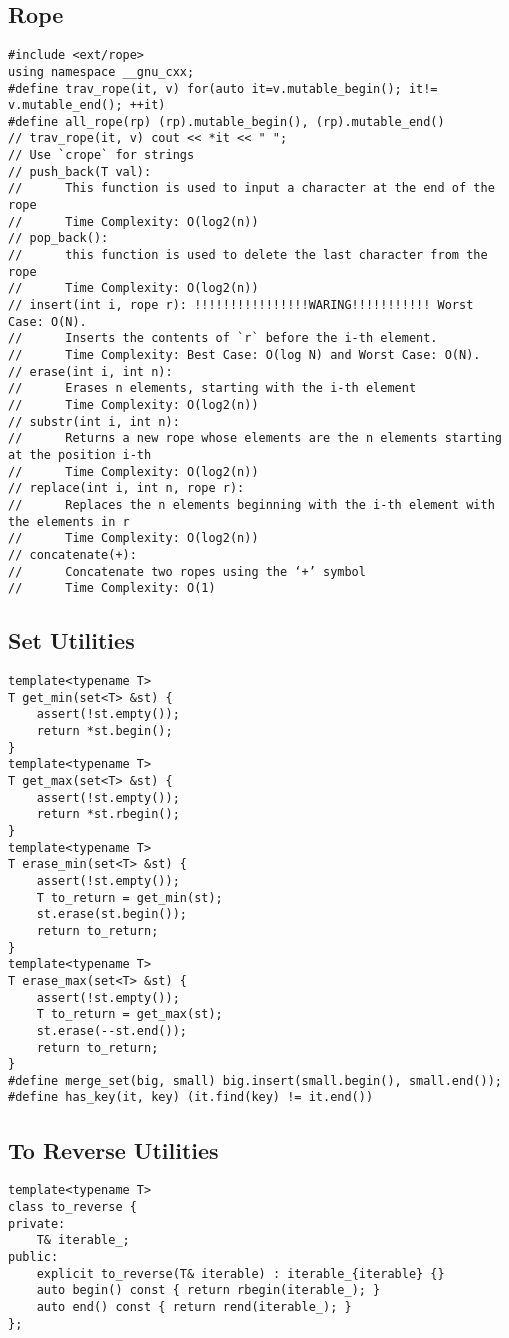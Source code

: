 \documentclass[10pt,letterpaper,twocolumn,twosided]{article}
\begin{document}
\subsection{Rope}
\begin{lstlisting}
#include <ext/rope>
using namespace __gnu_cxx;
#define trav_rope(it, v) for(auto it=v.mutable_begin(); it!= v.mutable_end(); ++it)
#define all_rope(rp) (rp).mutable_begin(), (rp).mutable_end()
// trav_rope(it, v) cout << *it << " ";
// Use `crope` for strings
// push_back(T val): 
//      This function is used to input a character at the end of the rope
//      Time Complexity: O(log2(n))
// pop_back():
//      this function is used to delete the last character from the rope
//      Time Complexity: O(log2(n))
// insert(int i, rope r): !!!!!!!!!!!!!!!!WARING!!!!!!!!!!! Worst Case: O(N).
//      Inserts the contents of `r` before the i-th element.
//      Time Complexity: Best Case: O(log N) and Worst Case: O(N). 
// erase(int i, int n):
//      Erases n elements, starting with the i-th element
//      Time Complexity: O(log2(n))
// substr(int i, int n):
//      Returns a new rope whose elements are the n elements starting at the position i-th
//      Time Complexity: O(log2(n))
// replace(int i, int n, rope r):
//      Replaces the n elements beginning with the i-th element with the elements in r
//      Time Complexity: O(log2(n))
// concatenate(+):
//      Concatenate two ropes using the ‘+’ symbol
//      Time Complexity: O(1)
\end{lstlisting}

\subsection{Set Utilities}
\begin{lstlisting}
template<typename T>
T get_min(set<T> &st) {
    assert(!st.empty());
    return *st.begin();
}
template<typename T>
T get_max(set<T> &st) {
    assert(!st.empty());
    return *st.rbegin();
}
template<typename T>
T erase_min(set<T> &st) {
    assert(!st.empty());
    T to_return = get_min(st);
    st.erase(st.begin());
    return to_return;
}
template<typename T>
T erase_max(set<T> &st) {
    assert(!st.empty());
    T to_return = get_max(st);
    st.erase(--st.end());
    return to_return;
}
#define merge_set(big, small) big.insert(small.begin(), small.end());
#define has_key(it, key) (it.find(key) != it.end())
\end{lstlisting}

\subsection{To Reverse Utilities}
\begin{lstlisting}
template<typename T>
class to_reverse {
private:
    T& iterable_;
public:
    explicit to_reverse(T& iterable) : iterable_{iterable} {}
    auto begin() const { return rbegin(iterable_); }
    auto end() const { return rend(iterable_); }
};
\end{lstlisting}
\end{document}
